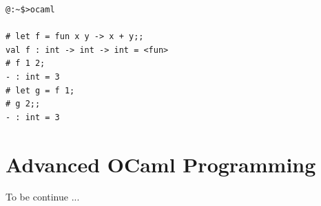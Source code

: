 \documentclass[10pt]{beamer}
\begin{document}
\begin{lstlisting}[style=zsh]
@:~$>ocaml

# let f = fun x y -> x + y;;
val f : int -> int -> int = <fun>
# f 1 2;
- : int = 3
# let g = f 1;
# g 2;;
- : int = 3
\end{lstlisting}

\newpage
%
%	
%	
%	

	\section{Advanced OCaml Programming}
	
	\newpage
	{
		\begin{frame}[standout]
			To be continue ...
		\end{frame}
	}
	
	
\end{document}
